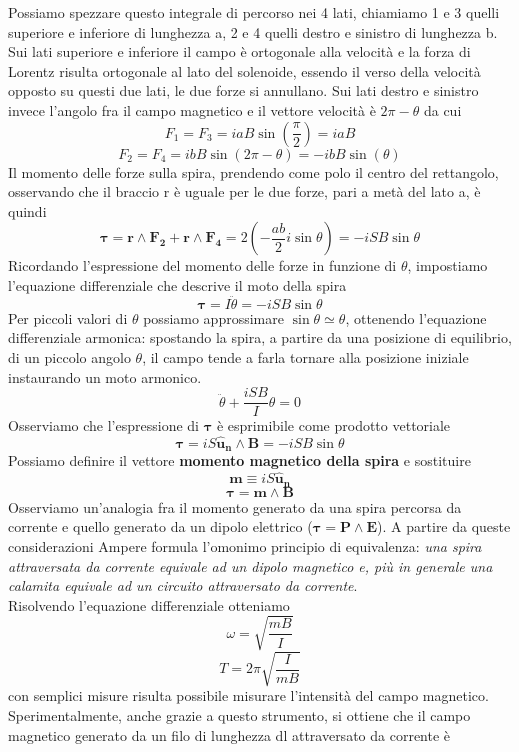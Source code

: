 \documentclass[10pt,a4paper]{article}
\begin{document}
Possiamo spezzare questo integrale di percorso nei 4 lati, chiamiamo 1 e 3 quelli superiore e inferiore di lunghezza a, 2 e 4 quelli destro e sinistro di lunghezza b.\\
Sui lati superiore e inferiore il campo è ortogonale alla velocità e la forza di Lorentz risulta ortogonale al lato del solenoide, essendo il verso della velocità opposto su questi due lati, le due forze si annullano. Sui lati destro e sinistro invece l'angolo fra il campo magnetico e il vettore velocità è \(2\pi-\theta\) da cui
\[F_1=F_3 = iaB \sin(\frac{\pi}{2}) = iaB \]
\[F_2=F_4 = ibB \sin(2\pi-\theta) = -ibB\sin(\theta) \]
Il momento delle forze sulla spira, prendendo come polo il centro del rettangolo, osservando che il braccio r è uguale per le due forze, pari a metà del lato a, è quindi
\[\mathbf{\tau}= \mathbf{r}\wedge\mathbf{F_2}+\mathbf{r}\wedge\mathbf{F_4}=2(-\frac{ab}{2}i\sin\theta)= -i SB \sin\theta\]
Ricordando l'espressione del momento delle forze in funzione di $\theta$, impostiamo l'equazione differenziale che descrive il moto della spira
\[\mathbf{\tau}=I\ddot{\theta}=- iSB\sin\theta\]
Per piccoli valori di $\theta$ possiamo approssimare $\sin\theta \simeq \theta$, ottenendo l'equazione differenziale armonica: spostando la spira, a partire da una posizione di equilibrio, di un piccolo angolo $\theta$, il campo tende a farla tornare alla posizione iniziale instaurando un moto armonico. 
\[\ddot{\theta}+ \frac{iSB}{I}\theta= 0 \]
Osserviamo che l'espressione di $\mathbf{\tau}$ è esprimibile come prodotto vettoriale
\[\mathbf{\tau}=iS\mathbf{\hat{u}_n}\wedge\mathbf{B}=-iSB\sin\theta\]
Possiamo definire il vettore \textbf{momento magnetico della spira} e sostituire
\[\mathbf{m}\equiv iS\mathbf{\hat{u}_n}\] 
\[\mathbf{\tau}=\mathbf{m}\wedge\mathbf{B}\]
Osserviamo un'analogia fra il momento generato da una spira percorsa da corrente e quello generato da un dipolo elettrico ($\mathbf{\tau}=\mathbf{P}\wedge\mathbf{E}$). A partire da queste considerazioni Ampere formula l'omonimo principio di equivalenza: \textit{una spira attraversata da corrente equivale ad un dipolo magnetico e, più in generale una calamita equivale ad un circuito attraversato da corrente}.\\
Risolvendo l'equazione differenziale otteniamo
\[\omega=\sqrt{\frac{mB}{I}}\]
\[T=2\pi\sqrt{\frac{I}{mB}}\]
con semplici misure risulta possibile misurare l'intensità del campo magnetico.\\
Sperimentalmente, anche grazie a questo strumento, si ottiene che il campo magnetico generato da un filo di lunghezza dl attraversato da corrente è
\end{document}
